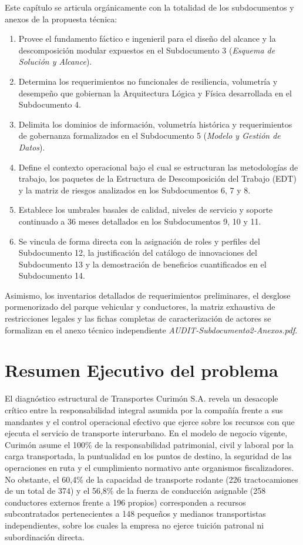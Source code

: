 Este capítulo se articula orgánicamente con la totalidad de los subdocumentos y anexos de la propuesta técnica:
\begin{enumerate}
  \item Provee el fundamento fáctico e ingenieril para el diseño del alcance y la descomposición modular expuestos en el Subdocumento 3 (\textit{Esquema de Solución y Alcance}).
  \item Determina los requerimientos no funcionales de resiliencia, volumetría y desempeño que gobiernan la Arquitectura Lógica y Física desarrollada en el Subdocumento 4.
  \item Delimita los dominios de información, volumetría histórica y requerimientos de gobernanza formalizados en el Subdocumento 5 (\textit{Modelo y Gestión de Datos}).
  \item Define el contexto operacional bajo el cual se estructuran las metodologías de trabajo, los paquetes de la Estructura de Descomposición del Trabajo (EDT) y la matriz de riesgos analizados en los Subdocumentos 6, 7 y 8.
  \item Establece los umbrales basales de calidad, niveles de servicio y soporte continuado a 36 meses detallados en los Subdocumentos 9, 10 y 11.
  \item Se vincula de forma directa con la asignación de roles y perfiles del Subdocumento 12, la justificación del catálogo de innovaciones del Subdocumento 13 y la demostración de beneficios cuantificados en el Subdocumento 14.
\end{enumerate}

Asimismo, los inventarios detallados de requerimientos preliminares, el desglose pormenorizado del parque vehicular y conductores, la matriz exhaustiva de restricciones legales y las fichas completas de caracterización de actores se formalizan en el anexo técnico independiente \textit{AUDIT-Subdocumento2-Anexos.pdf}.

\section{Resumen Ejecutivo del problema}\label{sec:2-resumen-ejecutivo}

El diagnóstico estructural de Transportes Curimón S.A. revela un desacople crítico entre la responsabilidad integral asumida por la compañía frente a sus mandantes y el control operacional efectivo que ejerce sobre los recursos con que ejecuta el servicio de transporte interurbano. En el modelo de negocio vigente, Curimón asume el 100\% de la responsabilidad patrimonial, civil y laboral por la carga transportada, la puntualidad en los puntos de destino, la seguridad de las operaciones en ruta y el cumplimiento normativo ante organismos fiscalizadores. No obstante, el 60,4\% de la capacidad de transporte rodante (226 tractocamiones de un total de 374) y el 56,8\% de la fuerza de conducción asignable (258 conductores externos frente a 196 propios) corresponden a recursos subcontratados pertenecientes a 148 pequeños y medianos transportistas independientes, sobre los cuales la empresa no ejerce tuición patronal ni subordinación directa.

